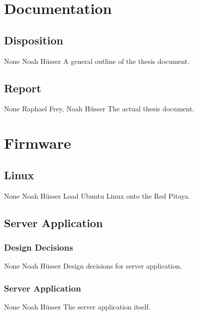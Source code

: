 \documentclass[a4paper,oneside]{alpenspecs/alpenspecs}
\begin{document}
\section{Documentation}
\label{sec:docs}

\subsection{Disposition}
\wpac
     {}
     {}
     {}
     {None}
     {}
     {Noah H\"usser}
     {%
        A general outline of the thesis document.%
     }

\subsection{Report}
\wpac
     {}
     {}
     {}
     {None}
     {}
     {Raphael Frey, Noah H\"usser}
     {%
        The actual thesis document.%
     }


\section{Firmware}
\label{sec:firmware}

\subsection{Linux}
\label{subsec:fw:linux}

\wpac
     {}
     {}
     {}
     {None}
     {}
     {Noah H\"usser}
     {%
        Load Ubuntu Linux onto the Red Pitaya.%
     }

\subsection{Server Application}
\label{subsec:fw:server}

\subsubsection{Design Decisions}
\label{subsubsec:fw:server:design-decisions}
\wpac
     {}
     {}
     {}
     {None}
     {}
     {Noah H\"usser}
     {%
         Design decisions for server application.
     }

\subsubsection{Server Application}
\label{subsubsec:fw:server:server}
\wpac
     {}
     {}
     {}
     {None}
     {}
     {Noah H\"usser}
     {%
         The server application itself.%
     }
\end{document}
